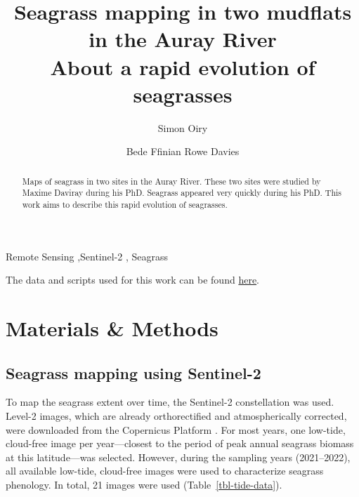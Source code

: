 \documentclass[
  number]{elsarticle}
\begin{document}
\begin{frontmatter}
\title{Seagrass mapping in two mudflats in the Auray
River \\\large{About a rapid evolution of seagrasses} }
\author[1]{Simon Oiry%
%
}
\author[1]{Bede Ffinian Rowe Davies%
%
}




        
\begin{abstract}
Maps of seagrass in two sites in the Auray River. These two sites were
studied by Maxime Daviray during his PhD. Seagrass appeared very quickly
during his PhD. This work aims to describe this rapid evolution of
seagrasses.
\end{abstract}





\begin{keyword}
    Remote Sensing \sep Sentinel-2 \sep 
    Seagrass
\end{keyword}
\end{frontmatter}
    

The data and scripts used for this work can be found
\href{https://github.com/SigOiry/Seagrass_maps_Maxime}{here}.

\section{Materials \& Methods}\label{materials-methods}

\subsection{Seagrass mapping using
Sentinel-2}\label{seagrass-mapping-using-sentinel-2}

To map the seagrass extent over time, the Sentinel-2 constellation was
used. Level-2 images, which are already orthorectified and
atmospherically corrected, were downloaded from the Copernicus Platform
\citep{Copernicus_Sentinel}. For most years, one low-tide, cloud-free
image per year---closest to the period of peak annual seagrass biomass
at this latitude---was selected. However, during the sampling years
(2021--2022), all available low-tide, cloud-free images were used to
characterize seagrass phenology. In total, 21 images were used
(Table~\ref{tbl-tide-data}).
\end{document}
